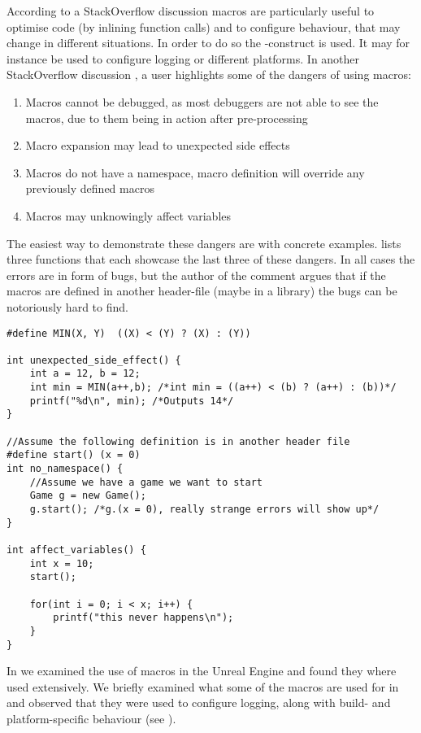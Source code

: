 According to a StackOverflow discussion \cite{so:c:macros} macros are particularly useful to optimise code (by inlining function calls) and to configure behaviour, that may change in different situations. In order to do so the -construct is used. It may for instance be used to configure logging or different platforms. In another StackOverflow discussion \cite{so:c:macros:evil}, a user highlights some of the dangers of using macros:
\begin{enumerate}
    \item Macros cannot be debugged, as most debuggers are not able to see the macros, due to them being in action after pre-processing
    \item Macro expansion may lead to unexpected side effects
    \item Macros do not have a namespace, macro definition will override any previously defined macros
    \item Macros may unknowingly affect variables
\end{enumerate}
The easiest way to demonstrate these dangers are with concrete examples.  lists three functions that each showcase the last three of these dangers. In all cases the errors are in form of bugs, but the author of the comment argues that if the macros are defined in another header-file (maybe in a library) the bugs can be notoriously hard to find.
\begin{lstlisting}[label={lst:c:macros:dangers}, caption={Dangers of using macros as argued by \cite{so:c:macros:evil}}, style={C}]
#define MIN(X, Y)  ((X) < (Y) ? (X) : (Y))

int unexpected_side_effect() {
    int a = 12, b = 12;
    int min = MIN(a++,b); /*int min = ((a++) < (b) ? (a++) : (b))*/
    printf("%d\n", min); /*Outputs 14*/
}

//Assume the following definition is in another header file
#define start() (x = 0)
int no_namespace() {
    //Assume we have a game we want to start
    Game g = new Game();
    g.start(); /*g.(x = 0), really strange errors will show up*/
}

int affect_variables() {
    int x = 10;
    start();
    
    for(int i = 0; i < x; i++) {
        printf("this never happens\n");
    }
}
\end{lstlisting}

In  we examined the use of macros in the Unreal Engine and found they where used extensively. We briefly examined what some of the macros are used for in and observed that they were used to configure logging, along with build- and platform-specific behaviour (see ).

